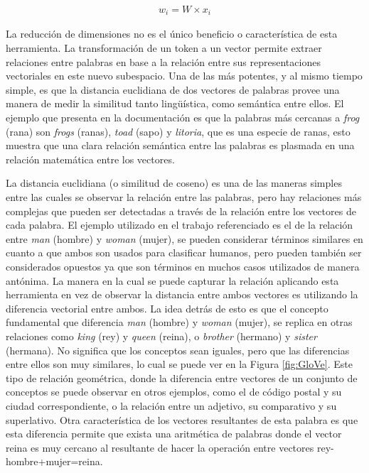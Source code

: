 \documentclass[spanish]{article}
\theoremstyle{definition}
\theoremstyle{remark}
\numberwithin{equation}{section}
\numberwithin{equation}{section} %
\begin{document}
\begin{equation}
\label{word_embeddings}
\begin{split}
w_i= W \times x_i
\end{split}
\end{equation} 
\par
La reducción de dimensiones no es el único beneficio o característica de esta herramienta. La transformación de un token a un vector permite extraer relaciones entre palabras en base a la relación entre sus representaciones vectoriales en este nuevo subespacio. Una de las más potentes, y al mismo tiempo simple, es que la distancia euclidiana de dos vectores de palabras provee una manera de medir la similitud tanto lingüística, como semántica entre ellos. El ejemplo que presenta en la documentación es que la palabras más cercanas a \textit{frog} (rana) son \textit{frogs} (ranas), \textit{toad} (sapo) y \textit{litoria}, que es una especie de ranas, esto muestra que una clara relación semántica entre las palabras es plasmada en una relación matemática entre los vectores.  
\par
La distancia euclidiana (o similitud de coseno) es una de las maneras simples entre las cuales se observar la relación entre las palabras, pero hay relaciones más complejas que pueden ser detectadas a través de la relación entre los vectores de cada palabra. El ejemplo utilizado en el trabajo referenciado es el de la relación entre \textit{man} (hombre) y \textit{woman} (mujer), se pueden considerar términos similares en cuanto a que ambos son usados para clasificar humanos, pero pueden también ser considerados opuestos ya que son términos en muchos casos utilizados de manera antónima. La manera en la cual se puede capturar la relación aplicando esta herramienta en vez de observar la distancia entre ambos vectores es utilizando la diferencia vectorial entre ambos. La idea detrás de esto es que el concepto fundamental que diferencia \textit{man} (hombre) y \textit{woman} (mujer), se replica en otras relaciones como \textit{king} (rey) y  \textit{queen} (reina), o \textit{brother} (hermano) y \textit{sister} (hermana). No significa que los conceptos sean iguales, pero que las diferencias entre ellos son muy similares, lo cual se puede ver en la Figura \ref{fig:GloVe}. Este tipo de relación geométrica, donde la diferencia entre vectores de un conjunto de conceptos se puede observar en otros ejemplos, como el de código postal y su ciudad correspondiente, o la relación entre un adjetivo, su comparativo y su superlativo. Otra característica de los vectores resultantes de esta palabra es que esta diferencia permite que exista una aritmética de palabras donde el vector reina es muy cercano al resultante de hacer la operación entre vectores rey-hombre+mujer=reina. 
\end{document}
